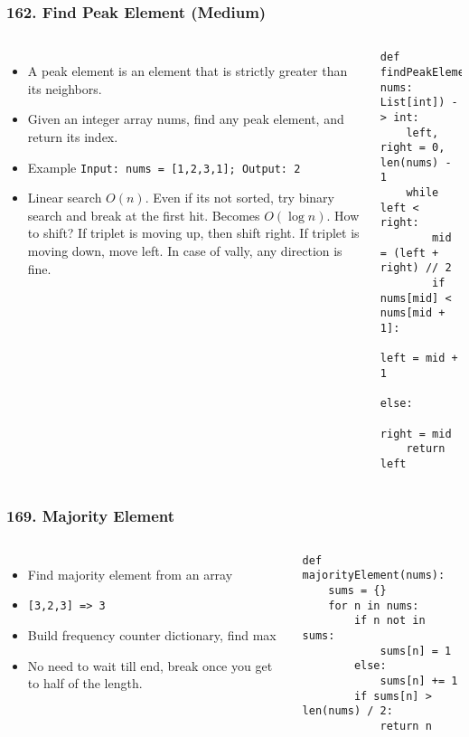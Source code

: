 \begin{frame}[fragile]\frametitle{162. Find Peak Element (Medium)}

	\begin{columns}[T]
	\begin{itemize}
	\item A peak element is an element that is strictly greater than its neighbors.
	\item Given an integer array nums, find any peak element, and return its index. 
	\item Example \lstinline|Input: nums = [1,2,3,1]; Output: 2|
	\item Linear search $O(n)$. Even if its not sorted, try binary search and break at the first hit. Becomes $O(\log n)$. How to shift? If triplet is moving up, then shift right. If triplet is moving down, move left. In case of vally, any direction is fine.
	\end{itemize}
		\begin{lstlisting}[basicstyle=\scriptsize]
def findPeakElement(self, nums: List[int]) -> int:
    left, right = 0, len(nums) - 1
    while left < right:
        mid = (left + right) // 2
        if nums[mid] < nums[mid + 1]:
            left = mid + 1
        else:
            right = mid
    return left
				\end{lstlisting}		
	\end{columns}
	
	
\end{frame}

\begin{frame}[fragile]\frametitle{169. Majority Element}

	\begin{columns}[T]
	\begin{itemize}
	\item Find majority element from an array
	\item \lstinline{[3,2,3] => 3}
	\item Build frequency counter dictionary, find max
	\item No need to wait till end, break once you get to half of the length.
	\end{itemize}
		\begin{lstlisting}[basicstyle=\scriptsize]
def majorityElement(nums):
    sums = {}
    for n in nums:
        if n not in sums:
            sums[n] = 1
        else:
            sums[n] += 1
        if sums[n] > len(nums) / 2:
            return n

				\end{lstlisting}		

	\end{columns}
		
\end{frame}

